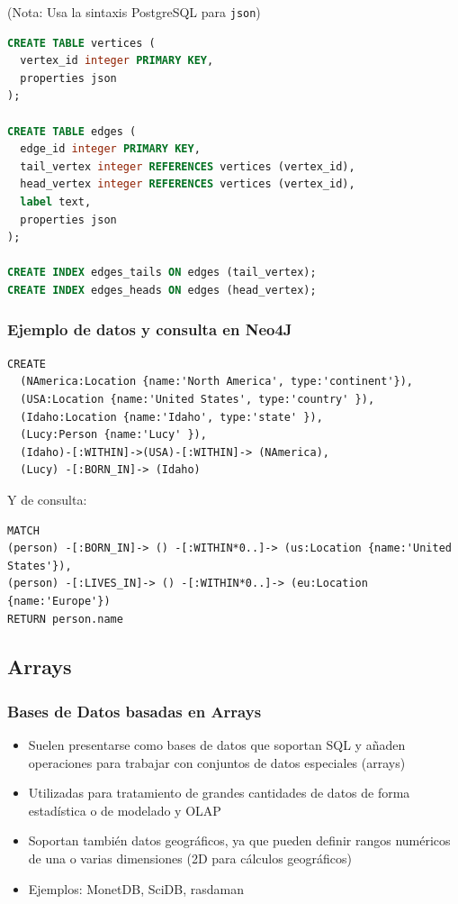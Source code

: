 \documentclass[14pt]{beamer}
\begin{document}
\begin{frame}
(Nota: Usa la sintaxis PostgreSQL para {\tt json})
\begin{lstlisting}[language=SQL]
CREATE TABLE vertices (
  vertex_id integer PRIMARY KEY,
  properties json
);

CREATE TABLE edges (
  edge_id integer PRIMARY KEY,
  tail_vertex integer REFERENCES vertices (vertex_id),
  head_vertex integer REFERENCES vertices (vertex_id),
  label text,
  properties json
);

CREATE INDEX edges_tails ON edges (tail_vertex);
CREATE INDEX edges_heads ON edges (head_vertex);
\end{lstlisting}
\end{frame}

\begin{frame}[fragile]
  \frametitle{Ejemplo de datos y consulta en Neo4J}
\vspace*{-1.5ex}
\begin{block}{}
\begin{lstlisting}
CREATE
  (NAmerica:Location {name:'North America', type:'continent'}),
  (USA:Location {name:'United States', type:'country' }),
  (Idaho:Location {name:'Idaho', type:'state' }),
  (Lucy:Person {name:'Lucy' }),
  (Idaho)-[:WITHIN]->(USA)-[:WITHIN]-> (NAmerica),
  (Lucy) -[:BORN_IN]-> (Idaho)
\end{lstlisting}
\end{block}
Y de consulta:
\begin{block}{}
\begin{lstlisting}
MATCH
(person) -[:BORN_IN]-> () -[:WITHIN*0..]-> (us:Location {name:'United States'}),
(person) -[:LIVES_IN]-> () -[:WITHIN*0..]-> (eu:Location {name:'Europe'})
RETURN person.name
\end{lstlisting}
\end{block}
\end{frame}

\subsection{Arrays}

\begin{frame}
  \frametitle{Bases de Datos basadas en Arrays}
  \begin{itemize}
\item Suelen presentarse como bases de datos que soportan SQL y añaden
  operaciones para trabajar con conjuntos de datos especiales (arrays)
\item Utilizadas para tratamiento de grandes cantidades de datos de forma
  estadística o de modelado y OLAP
\item Soportan también datos geográficos, ya que pueden definir rangos
  numéricos de una o varias dimensiones (2D para cálculos geográficos)
\item Ejemplos: MonetDB, SciDB, rasdaman
  \end{itemize}
\end{frame}
\end{document}
